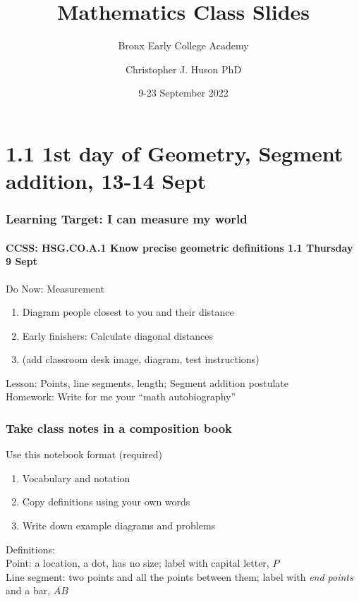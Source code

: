 \documentclass{beamer}
\title{Mathematics Class Slides}
\subtitle{Bronx Early College Academy}
\author{Christopher J. Huson PhD}
\date{9-23 September 2022}
\begin{document}
\frame{\titlepage}
\section[Outline]{}
\frame{\tableofcontents}

\section{1.1 1st day of Geometry, Segment addition, 13-14 Sept}
\frame
{
  \frametitle{Learning Target: I can measure my world}
  \framesubtitle{CCSS: HSG.CO.A.1 Know precise geometric definitions \hfill \alert{1.1 Thursday 9 Sept}}

  \begin{block}{Do Now: Measurement}
  \begin{enumerate}
      \item Diagram people closest to you and their distance
      \item Early finishers: Calculate diagonal distances
      \item (add classroom desk image, diagram, test instructions)
  \end{enumerate}
  \end{block}
  Lesson: Points, line segments, length; Segment addition postulate \\[0.25cm]
  Homework: Write for me your ``math autobiography''
}

\frame
{
  \frametitle{Take class notes in a composition book}
  \begin{block}{Use this notebook format (required)}
    \begin{enumerate}
      \item Vocabulary and notation
      \item Copy definitions using your own words
      \item Write down example diagrams and problems
    \end{enumerate}
    \end{block}
    Definitions: \\
  Point: a location, a dot, has no size; label with capital letter, $P$ \\[0.25cm]
  Line segment: two points and all the points between them; label with \emph{end points} and a bar, $\overline{AB}$ \\
}
\end{document}
